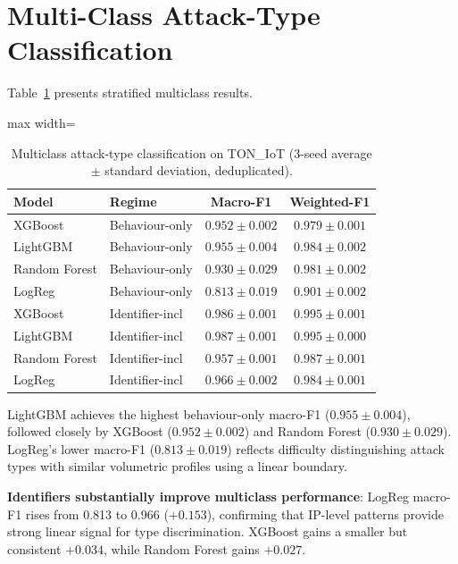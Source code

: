 \documentclass[12pt,a4paper]{report}
\begin{document}
\section{Multi-Class Attack-Type Classification}
\label{sec:multiclass-results}

Table~\ref{tab:multiclass} presents stratified multiclass results.

\begin{table}[H]
\centering
\caption{Multiclass attack-type classification on TON\_IoT (3-seed average $\pm$ standard deviation, deduplicated).}
\label{tab:multiclass}
\begin{adjustbox}{max width=\textwidth}
\begin{tabular}{llcc}
\toprule
\textbf{Model} & \textbf{Regime} & \textbf{Macro-F1} & \textbf{Weighted-F1} \\
\midrule
XGBoost & Behaviour-only & $0.952 \pm 0.002$ & $0.979 \pm 0.001$ \\
LightGBM & Behaviour-only & $0.955 \pm 0.004$ & $0.984 \pm 0.002$ \\
Random Forest & Behaviour-only & $0.930 \pm 0.029$ & $0.981 \pm 0.002$ \\
LogReg & Behaviour-only & $0.813 \pm 0.019$ & $0.901 \pm 0.002$ \\
\midrule
XGBoost & Identifier-incl & $0.986 \pm 0.001$ & $0.995 \pm 0.001$ \\
LightGBM & Identifier-incl & $0.987 \pm 0.001$ & $0.995 \pm 0.000$ \\
Random Forest & Identifier-incl & $0.957 \pm 0.001$ & $0.987 \pm 0.001$ \\
LogReg & Identifier-incl & $0.966 \pm 0.002$ & $0.984 \pm 0.001$ \\
\bottomrule
\end{tabular}
\end{adjustbox}
\end{table}

LightGBM achieves the highest behaviour-only macro-F1 ($0.955 \pm 0.004$), followed closely by XGBoost ($0.952 \pm 0.002$) and Random Forest ($0.930 \pm 0.029$). LogReg's lower macro-F1 ($0.813 \pm 0.019$) reflects difficulty distinguishing attack types with similar volumetric profiles using a linear boundary.

\textbf{Identifiers substantially improve multiclass performance}: LogReg macro-F1 rises from 0.813 to 0.966 ($+0.153$), confirming that IP-level patterns provide strong linear signal for type discrimination. XGBoost gains a smaller but consistent $+0.034$, while Random Forest gains $+0.027$.
\end{document}
